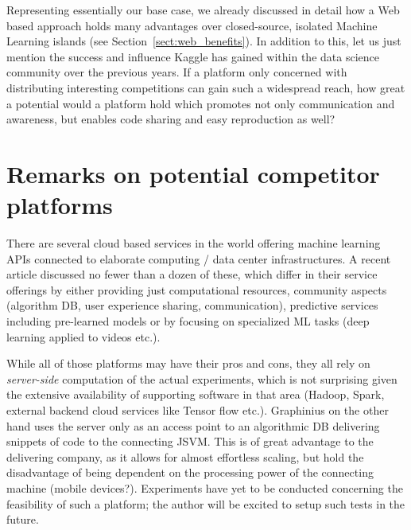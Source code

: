 	Representing essentially our base case, we already discussed in detail how a Web based approach holds many advantages over closed-source, isolated Machine Learning islands (see Section~\ref{sect:web_benefits}). In addition to this, let us just mention the success and influence Kaggle has gained within the data science community over the previous years. If a platform only concerned with distributing interesting competitions can gain such a widespread reach, how great a potential would a platform hold which promotes not only communication and awareness, but enables code sharing and easy reproduction as well?


\section{Remarks on potential competitor platforms}
\label{sect:potential_competitors}

	There are several cloud based services in the world offering machine learning APIs connected to elaborate computing / data center infrastructures. A recent article \cite{MLaaSTop10} discussed no fewer than a dozen of these, which differ in their service offerings by either providing just computational resources, community aspects (algorithm DB, user experience sharing, communication), predictive services including pre-learned models or by focusing on specialized ML tasks (deep learning applied to videos etc.).
	
	While all of those platforms may have their pros and cons, they all rely on \textit{server-side} computation of the actual experiments, which is not surprising given the extensive availability of supporting software in that area (Hadoop, Spark, external backend cloud services like Tensor flow etc.). Graphinius on the other hand uses the server only as an access point to an algorithmic DB delivering snippets of code to the connecting JSVM. This is of great advantage to the delivering company, as it allows for almost effortless scaling, but hold the disadvantage of being dependent on the processing power of the connecting machine (mobile devices?). Experiments have yet to be conducted concerning the feasibility of such a platform; the author will be excited to setup such tests in the future.
	
	
	
	
	